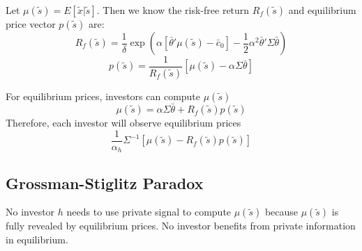 \documentclass[11pt, a4paper, oneside]{article}
\theoremstyle{definition}
\theoremstyle{proposition}
\theoremstyle{corollary}
\theoremstyle{lemma}
\theoremstyle{theorem}
\begin{document}
Let $\mu(\tilde{s}) = E[\tilde{x}|\tilde{s}]$. Then we know the risk-free return $R_f(\tilde{s})$ and equilibrium price vector $p(\tilde{s})$ are:
$$R_f(\tilde{s}) = \frac{1}{\delta} \exp\left(\alpha[\bar{\theta}'\mu(\tilde{s}) - \bar{c}_0] - \frac{1}{2}\alpha^2\bar{\theta}'\Sigma \bar{\theta}\right)$$
$$p(\tilde{s}) = \frac{1}{R_f(\tilde{s})}[\mu(\tilde{s}) - \alpha \Sigma\bar{\theta}]$$

For equilibrium prices, investors can compute $\mu(\tilde{s})$
$$\mu(\tilde{s}) = \alpha \Sigma \bar{\theta} + R_f(\tilde{s}) p(\tilde{s})$$
Therefore, each investor will observe equilibrium prices
$$\frac{1}{\alpha_h}\Sigma^{-1}[\mu(\tilde{s}) - R_f(\tilde{s})p(\tilde{s})]$$

\subsection{Grossman-Stiglitz Paradox}
No investor $h$ needs to use private signal to compute $\mu(\tilde{s})$ because $\mu(\tilde{s})$ is fully revealed by equilibrium prices. No investor benefits from private information in equilibrium. 
\end{document}
